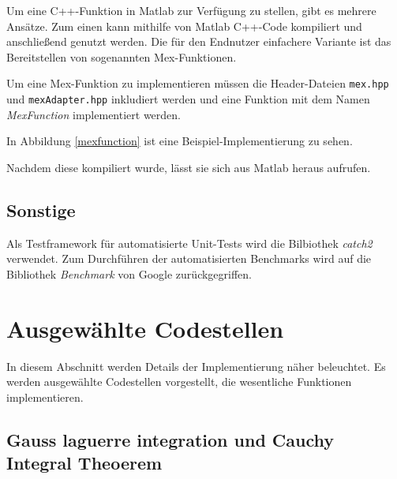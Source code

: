 Um eine C++-Funktion in Matlab zur Verfügung zu stellen, gibt es mehrere Ansätze.
Zum einen kann mithilfe von Matlab C++-Code kompiliert und anschließend genutzt werden. 
Die für den Endnutzer einfachere Variante ist das Bereitstellen von sogenannten Mex-Funktionen.

Um eine Mex-Funktion zu implementieren müssen die Header-Dateien \texttt{mex.hpp} und \texttt{mexAdapter.hpp} inkludiert werden
und eine Funktion mit dem Namen \textit{MexFunction} implementiert werden. 

In Abbildung \ref{mexfunction} ist eine Beispiel-Implementierung zu sehen.
\begin{center}
    
    \label{mexfunction}
\end{center}

Nachdem diese kompiliert wurde, lässt sie sich aus Matlab heraus aufrufen.


\subsection{Sonstige}

Als Testframework für automatisierte Unit-Tests wird die Bilbiothek \textit{catch2} verwendet.
Zum Durchführen der automatisierten Benchmarks wird auf die Bibliothek \textit{Benchmark} von Google zurückgegriffen.






\section{Ausgewählte Codestellen}

In diesem Abschnitt werden Details der Implementierung näher beleuchtet. Es werden ausgewählte Codestellen vorgestellt, die wesentliche Funktionen implementieren.

\subsection{Gauss laguerre integration und Cauchy Integral Theoerem}\label{gauss_laguerre_section}

